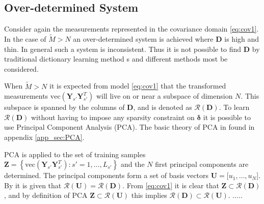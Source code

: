 \subsection{Over-determined System}\label{sec:over_det}
Consider again the measurements represented in the covariance domain \eqref{eq:cov1}.
In the case of $\widetilde{M} > N$ an over-determined system is achieved where $\textbf{D}$ is high and thin. In general such a system is inconsistent. Thus it is not possible to find $\textbf{D}$ by traditional dictionary learning method	s and different methods most be considered.

When $ \widetilde{M} > N $ it is expected from model \eqref{eq:cov1} that the transformed measurements $\text{vec}\left( \mathbf{Y}_{s'} \mathbf{Y}_{s'}^T \right)$ will live on or near a subspace of dimension $N$. 
This subspace is spanned by the columns of $\textbf{D}$, and is denoted as $\mathcal{R}(\textbf{D})$. 
To learn $\mathcal{R}(\textbf{D})$ without having to impose any sparsity constraint on $\boldsymbol{\delta}$ it is possible to use Principal Component Analysis (PCA). The basic theory of PCA in found in appendix \ref{app_sec:PCA}. 

PCA is applied to the set of training samples $\textbf{Z} = \left\{\text{vec}\left( \mathbf{Y}_{s'} \mathbf{Y}_{s'}^T \right) : s' = 1, \hdots, L_{s'} \right\}$ and the $N$ first principal components are determined. The principal components form a set of basis vectors $\textbf{U}=[u_1,\hdots, u_N$]. By \cite{Balkan2015} it is given that $\mathcal{R}(\textbf{U})=\mathcal{R}(\textbf{D})$. From \eqref{eq:cov1} it is clear that $\textbf{Z} \subset \mathcal{R}(\textbf{D})$, and by definition of PCA $\textbf{Z} \subset \mathcal{R}(\textbf{U})$ this implies $\mathcal{R}(\textbf{D}) \subset \mathcal{R}(\textbf{U})$.
.....
  
